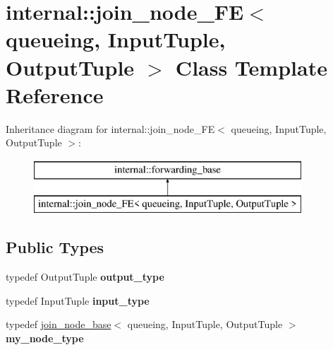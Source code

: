\hypertarget{classinternal_1_1join__node__FE_3_01queueing_00_01InputTuple_00_01OutputTuple_01_4}{}\section{internal\+:\+:join\+\_\+node\+\_\+\+F\+E$<$ queueing, Input\+Tuple, Output\+Tuple $>$ Class Template Reference}
\label{classinternal_1_1join__node__FE_3_01queueing_00_01InputTuple_00_01OutputTuple_01_4}
Inheritance diagram for internal\+:\+:join\+\_\+node\+\_\+\+F\+E$<$ queueing, Input\+Tuple, Output\+Tuple $>$\+:\begin{figure}[H]
\begin{center}
\leavevmode
\includegraphics[height=2.000000cm]{classinternal_1_1join__node__FE_3_01queueing_00_01InputTuple_00_01OutputTuple_01_4}
\end{center}
\end{figure}
\subsection*{Public Types}
\begin{DoxyCompactItemize}
\item 
\hypertarget{classinternal_1_1join__node__FE_3_01queueing_00_01InputTuple_00_01OutputTuple_01_4_ab013ea8d689fe38236727b0d554f1f2c}{}typedef Output\+Tuple {\bfseries output\+\_\+type}\label{classinternal_1_1join__node__FE_3_01queueing_00_01InputTuple_00_01OutputTuple_01_4_ab013ea8d689fe38236727b0d554f1f2c}

\item 
\hypertarget{classinternal_1_1join__node__FE_3_01queueing_00_01InputTuple_00_01OutputTuple_01_4_a1bb7d94db7f9e8e2c14cda9f638a371e}{}typedef Input\+Tuple {\bfseries input\+\_\+type}\label{classinternal_1_1join__node__FE_3_01queueing_00_01InputTuple_00_01OutputTuple_01_4_a1bb7d94db7f9e8e2c14cda9f638a371e}

\item 
\hypertarget{classinternal_1_1join__node__FE_3_01queueing_00_01InputTuple_00_01OutputTuple_01_4_a19a9fe062537b90ca3283caeb5b8fbb4}{}typedef \hyperlink{classinternal_1_1join__node__base}{join\+\_\+node\+\_\+base}$<$ queueing, Input\+Tuple, Output\+Tuple $>$ {\bfseries my\+\_\+node\+\_\+type}\label{classinternal_1_1join__node__FE_3_01queueing_00_01InputTuple_00_01OutputTuple_01_4_a19a9fe062537b90ca3283caeb5b8fbb4}

\end{DoxyCompactItemize}

